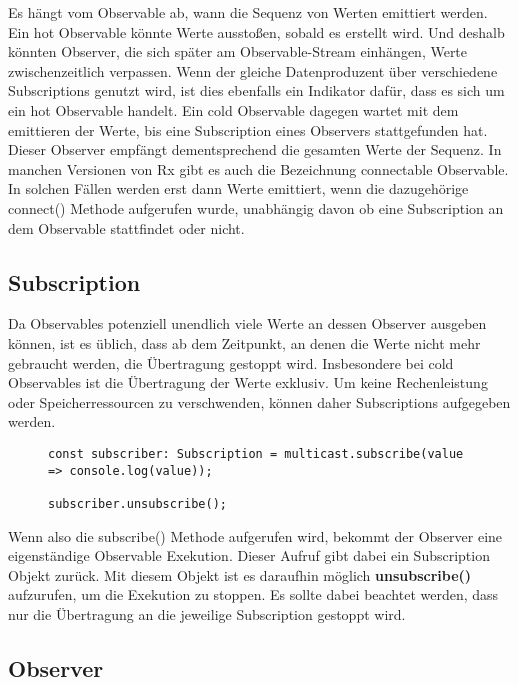 \noindent
Es hängt vom Observable ab, wann die Sequenz von Werten emittiert werden. Ein hot Observable könnte Werte ausstoßen, sobald es erstellt wird. Und deshalb könnten Observer, die sich später am Observable-Stream einhängen, Werte zwischenzeitlich verpassen. Wenn der gleiche Datenproduzent über verschiedene Subscriptions genutzt wird, ist dies ebenfalls ein Indikator dafür, dass es sich um ein hot Observable handelt. Ein cold Observable dagegen wartet mit dem emittieren der Werte, bis eine Subscription eines Observers stattgefunden hat. Dieser Observer empfängt dementsprechend die gesamten Werte der Sequenz. In manchen Versionen von Rx gibt es auch die Bezeichnung connectable Observable. In solchen Fällen werden erst dann Werte emittiert, wenn die dazugehörige connect() Methode aufgerufen wurde, unabhängig davon ob eine Subscription an dem Observable stattfindet oder nicht\cite{hot-vs-cold-part-2}.

\subsection{Subscription}

Da Observables potenziell unendlich viele Werte an dessen Observer ausgeben können, ist es üblich, dass ab dem Zeitpunkt, an denen die Werte nicht mehr gebraucht werden, die Übertragung gestoppt wird. Insbesondere bei cold Observables ist die Übertragung der Werte exklusiv. Um keine Rechenleistung oder Speicherressourcen zu verschwenden, können daher Subscriptions aufgegeben werden.

\begin{figure}[H]
\begin{lstlisting}[basicstyle=\small]
const subscriber: Subscription = multicast.subscribe(value => console.log(value));

subscriber.unsubscribe();
\end{lstlisting}
\end{figure}

\noindent
Wenn also die subscribe() Methode aufgerufen wird, bekommt der Observer eine eigenständige Observable Exekution. Dieser Aufruf gibt dabei ein Subscription Objekt zurück. Mit diesem Objekt ist es daraufhin möglich \textbf{unsubscribe()} aufzurufen, um die Exekution zu stoppen. Es sollte dabei beachtet werden, dass nur die Übertragung an die jeweilige Subscription gestoppt wird.

\subsection{Observer}

